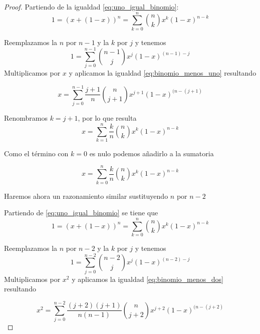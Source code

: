\begin{proof}
    Partiendo de la igualdad \eqref{eq:uno_igual_binomio}:
    \begin{equation}
        1 = (x+ (1-x))^n = \sum_{k=0}^n \binom{n}{k} x^{k} (1-x)^{n-k}
    \end{equation}

    Reemplazamos la $n$ por $n-1$ y la $k$ por $j$ y tenemos 
    \begin{equation}
        1 = \sum_{j=0}^{n-1} \binom{n-1}{j} x^{j} (1-x)^{(n-1)-j}
    \end{equation}
    Multiplicamos por $x$ y aplicamos la igualdad \eqref{eq:binomio_menos_uno} resultando 

    \begin{equation}
        x = \sum_{j=0}^{n-1} \frac{j+1}{n} \binom{n}{j+1} x^{j+1} (1-x)^{(n-(j+1)}
    \end{equation}

    Renombramos $k= j+1$, por lo que resulta
    \begin{equation}
        x = \sum_{k=1}^{n} \frac{k}{n} \binom{n}{k} x^{k} (1-x)^{n-k}
    \end{equation}

    Como el término con $k=0$ es nulo podemos añadirlo a la sumatoria
    
    \begin{equation} \label{eq:desarrollo_binomio_uno}
        x = \sum_{k=0}^{n} \frac{k}{n} \binom{n}{k} x^{k} (1-x)^{n-k}
    \end{equation}

    Haremos ahora un razonamiento similar sustituyendo $n$ por $n-2$

    Partiendo de \eqref{eq:uno_igual_binomio} se tiene que 
    \begin{equation}
        1 = (x+ (1-x))^n = \sum_{k=0}^n \binom{n}{k} x^{k} (1-x)^{n-k}
    \end{equation}

    Reemplazamos la $n$ por $n-2$ y la $k$ por $j$ y tenemos 
    \begin{equation}
        1 = \sum_{j=0}^{n-2} \binom{n-2}{j} x^{j} (1-x)^{(n-2)-j}
    \end{equation}
    Multiplicamos por $x^2$ y aplicamos la igualdad \eqref{eq:binomio_menos_dos} resultando 

    \begin{equation}
        x^2 = \sum_{j=0}^{n-2} \frac{(j+2)(j+1)}{n(n-1)} \binom{n}{j+2} x^{j+2} (1-x)^{(n-(j+2)}
    \end{equation}


\end{proof}
